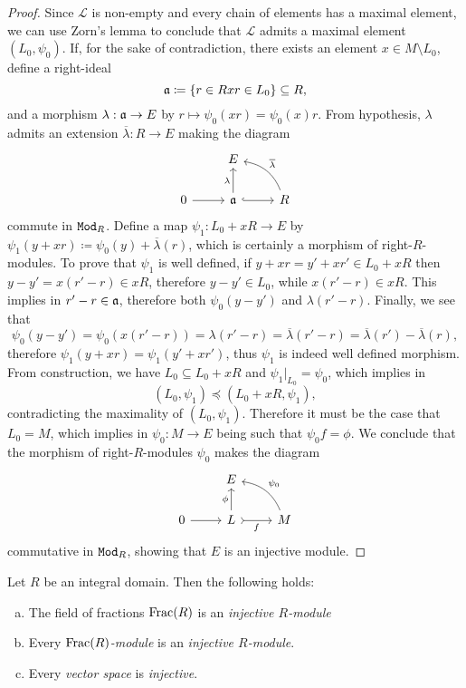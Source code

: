 \begin{proof}
Since \(\mathcal{L}\) is non-empty and every chain of elements has a maximal
element, we can use Zorn's lemma to conclude that \(\mathcal{L}\) admits a
maximal element \((L_0, \psi_0)\). If, for the sake of contradiction, there
exists an element \(x \in M \setminus L_0\), define a right-ideal
\[
\mathfrak{a} \coloneq \{r \in R \relax x r \in L_0\} \subseteq R,
\]
and a morphism \(\lambda: \mathfrak{a} \to E\) by
\(r \mapsto \psi_0(x r) = \psi_0(x) r\). From hypothesis, \(\lambda\) admits an
extension \(\overline{\lambda}: R \to E\) making the diagram
\[
\begin{tikzcd}
&E &
\\
0 \ar[r] &\ideal a \ar[u, "\lambda"] \ar[r, hook]
&R \ar[lu, "\overline{\lambda}"', bend right]
\end{tikzcd}
\]
commute in \({\texttt{Mod}_{R}}\). Define a map \(\psi_1: L_0 + x R \to E\) by
\(\psi_1(y + x r) \coloneq \psi_0(y) + \overline{\lambda}(r)\), which is
certainly a morphism of right-\(R\)-modules. To prove that \(\psi_1\) is well
defined, if \(y + x r = y' + x r' \in L_0 + x R\) then
\(y - y' = x(r' - r) \in x R\), therefore \(y - y' \in L_0\), while
\(x (r' - r) \in x R\). This implies in \(r' - r \in \mathfrak{a}\), therefore both
\(\psi_0(y - y')\) and \(\lambda(r' - r)\). Finally, we see that
\[
\psi_0(y - y')
= \psi_0(x (r' - r))
= \lambda(r' - r)
= \overline{\lambda}(r' - r)
= \overline{\lambda}(r') - \overline{\lambda}(r),
\]
therefore \(\psi_1(y + x r) = \psi_1(y' + x r')\), thus \(\psi_1\) is indeed
well defined morphism. From construction, we have \(L_0 \subseteq L_0 + x R\)
and \(\psi_1|_{L_0} = \psi_0\), which implies in
\[
(L_0, \psi_1) \preceq (L_0 + x R, \psi_1),
\]
contradicting the maximality of \((L_0, \psi_1)\). Therefore it must be the case
that \(L_0 = M\), which implies in \(\psi_0: M \to E\) being such that
\(\psi_0 f = \phi\). We conclude that the morphism of right-\(R\)-modules
\(\psi_0\) makes the diagram
\[
\begin{tikzcd}
&E &
\\
0 \ar[r] &L \ar[u, "\phi"] \ar[r, tail, "f"']
&M \ar[lu, "\psi_0"', bend right]
\end{tikzcd}
\]
commutative in \({\texttt{Mod}_{R}}\), showing that \(E\) is an injective module.
\end{proof}

\begin{corollary}
\label{cor:field-of-fractions-injective}
Let \(R\) be an integral domain. Then the following holds:
\begin{enumerate}[(a)]\setlength\itemsep{0em}
\item The field of fractions \(\operatorname{Frac}(R)\) is an \emph{injective \(R\)-module}

\item Every \emph{\(\operatorname{Frac}(R)\)-module} is an \emph{injective \(R\)-module}.

\item Every \emph{vector space} is \emph{injective}.
\end{enumerate}
\end{corollary}

